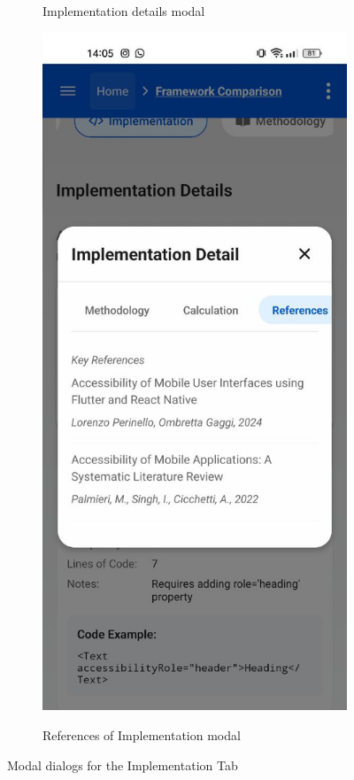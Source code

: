 \begin{figure}[ht]
\begin{subfigure}[b]{0.48\textwidth}
        \caption{Implementation details modal}
        \label{fig:implementation-details-dialog}
    \end{subfigure}
    \hfill
    \begin{subfigure}[b]{0.48\textwidth}
        \centering
        \includegraphics[width=\linewidth, alt={Modal dialog showing academic references for Implementation tab section}]{img/implementation-references.jpg}
        \caption{References of Implementation modal}
        \label{fig:academic-references-dialog}
    \end{subfigure}
    \caption{Modal dialogs for the Implementation Tab}
    \label{fig:modal_accessibility}
\end{figure}


